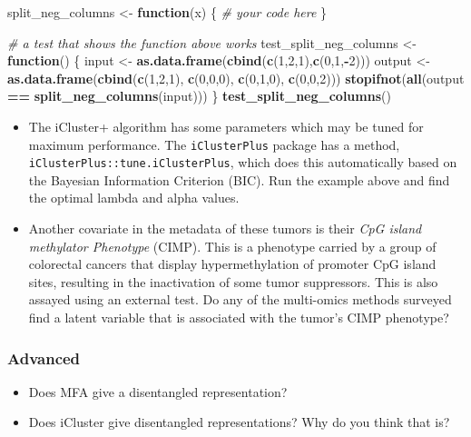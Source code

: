 \documentclass[12pt,]{krantz}
\newenvironment{Shaded}{\begin{snugshade}}{\end{snugshade}}
\newcommand{\CommentTok}[1]{\textcolor[rgb]{0.56,0.35,0.01}{\textit{#1}}}
\newcommand{\ControlFlowTok}[1]{\textcolor[rgb]{0.13,0.29,0.53}{\textbf{#1}}}
\newcommand{\DecValTok}[1]{\textcolor[rgb]{0.00,0.00,0.81}{#1}}
\newcommand{\KeywordTok}[1]{\textcolor[rgb]{0.13,0.29,0.53}{\textbf{#1}}}
\newcommand{\NormalTok}[1]{#1}
\newcommand{\OperatorTok}[1]{\textcolor[rgb]{0.81,0.36,0.00}{\textbf{#1}}}
\newcommand{\StringTok}[1]{\textcolor[rgb]{0.31,0.60,0.02}{#1}}
\providecommand{\tightlist}{%
  \setlength{\itemsep}{0pt}\setlength{\parskip}{0pt}}
\begin{document}
\begin{Shaded}
\begin{Highlighting}[]
\NormalTok{split_neg_columns <-}\StringTok{ }\ControlFlowTok{function}\NormalTok{(x) \{}
    \CommentTok{# your code here}
\NormalTok{\}}

\CommentTok{# a test that shows the function above works}
\NormalTok{test_split_neg_columns <-}\StringTok{ }\ControlFlowTok{function}\NormalTok{() \{}
\NormalTok{    input <-}\StringTok{ }\KeywordTok{as.data.frame}\NormalTok{(}\KeywordTok{cbind}\NormalTok{(}\KeywordTok{c}\NormalTok{(}\DecValTok{1}\NormalTok{,}\DecValTok{2}\NormalTok{,}\DecValTok{1}\NormalTok{),}\KeywordTok{c}\NormalTok{(}\DecValTok{0}\NormalTok{,}\DecValTok{1}\NormalTok{,}\OperatorTok{-}\DecValTok{2}\NormalTok{)))}
\NormalTok{    output <-}\StringTok{ }\KeywordTok{as.data.frame}\NormalTok{(}\KeywordTok{cbind}\NormalTok{(}\KeywordTok{c}\NormalTok{(}\DecValTok{1}\NormalTok{,}\DecValTok{2}\NormalTok{,}\DecValTok{1}\NormalTok{), }\KeywordTok{c}\NormalTok{(}\DecValTok{0}\NormalTok{,}\DecValTok{0}\NormalTok{,}\DecValTok{0}\NormalTok{), }\KeywordTok{c}\NormalTok{(}\DecValTok{0}\NormalTok{,}\DecValTok{1}\NormalTok{,}\DecValTok{0}\NormalTok{), }\KeywordTok{c}\NormalTok{(}\DecValTok{0}\NormalTok{,}\DecValTok{0}\NormalTok{,}\DecValTok{2}\NormalTok{)))}
    \KeywordTok{stopifnot}\NormalTok{(}\KeywordTok{all}\NormalTok{(output }\OperatorTok{==}\StringTok{ }\KeywordTok{split_neg_columns}\NormalTok{(input)))}
\NormalTok{\}}
\KeywordTok{test_split_neg_columns}\NormalTok{()}
\end{Highlighting}
\end{Shaded}

\begin{itemize}
\item
  The iCluster+ algorithm has some parameters which may be tuned for maximum performance. The \texttt{iClusterPlus} package has a method, \texttt{iClusterPlus::tune.iClusterPlus}, which does this automatically based on the Bayesian Information Criterion (BIC). Run the example above and find the optimal lambda and alpha values.
\item
  Another covariate in the metadata of these tumors is their \emph{CpG island methylator Phenotype} (CIMP). This is a phenotype carried by a group of colorectal cancers that display hypermethylation of promoter CpG island sites, resulting in the inactivation of some tumor suppressors. This is also assayed using an external test. Do any of the multi-omics methods surveyed find a latent variable that is associated with the tumor's CIMP phenotype?
\end{itemize}

\hypertarget{advanced}{%
\subsubsection{Advanced}\label{advanced}}

\begin{itemize}
\tightlist
\item
  Does MFA give a disentangled representation?
\item
  Does iCluster give disentangled representations? Why do you think that is?
\end{itemize}



\backmatter
\printindex
\end{document}
